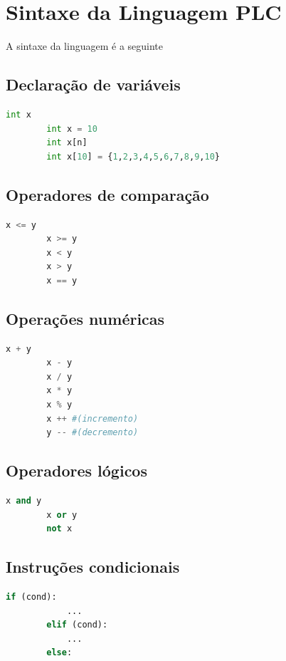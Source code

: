 \documentclass[11pt,a4paper]{report}
\begin{document}
    \section{Sintaxe da Linguagem PLC}
    A sintaxe da linguagem é a seguinte

    \subsection{Declaração de variáveis}
    \begin{lstlisting}[language=Python]
        int x
        int x = 10
        int x[n]
        int x[10] = {1,2,3,4,5,6,7,8,9,10}
    \end{lstlisting}

    \subsection{Operadores de comparação}
    \begin{lstlisting}[language=Python]
        x <= y
        x >= y
        x < y
        x > y
        x == y
    \end{lstlisting}

    \subsection{Operações numéricas}
    \begin{lstlisting}[language=Python]
        x + y
        x - y
        x / y
        x * y
        x % y
        x ++ #(incremento)
        y -- #(decremento)
    \end{lstlisting}

    \subsection{Operadores lógicos}
    \begin{lstlisting}[language=Python]
        x and y
        x or y
        not x
    \end{lstlisting}

    \subsection{Instruções condicionais}
    \begin{lstlisting}[language=Python]
        if (cond):
            ...
        elif (cond):
            ...
        else:
    \end{lstlisting}
\end{document}

